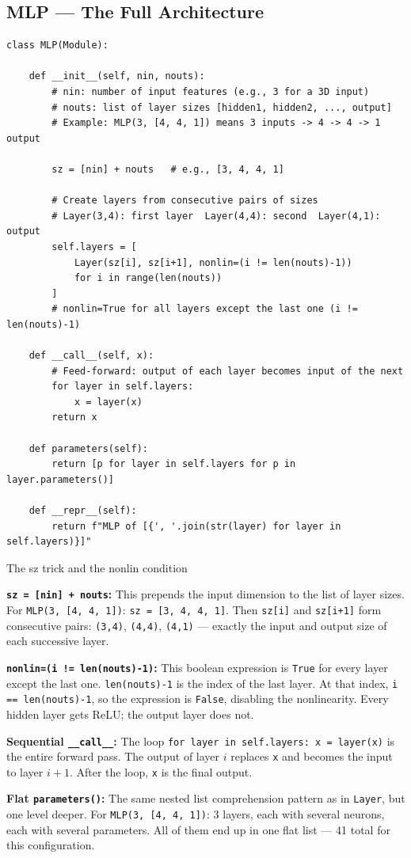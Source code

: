 \documentclass[12pt,a4paper]{article}
\newcommand{\code}[1]{\texttt{\small\color{deepblue}#1}}
\begin{document}
\subsection{MLP — The Full Architecture}

\begin{lstlisting}
class MLP(Module):

    def __init__(self, nin, nouts):
        # nin: number of input features (e.g., 3 for a 3D input)
        # nouts: list of layer sizes [hidden1, hidden2, ..., output]
        # Example: MLP(3, [4, 4, 1]) means 3 inputs -> 4 -> 4 -> 1 output

        sz = [nin] + nouts   # e.g., [3, 4, 4, 1]

        # Create layers from consecutive pairs of sizes
        # Layer(3,4): first layer  Layer(4,4): second  Layer(4,1): output
        self.layers = [
            Layer(sz[i], sz[i+1], nonlin=(i != len(nouts)-1))
            for i in range(len(nouts))
        ]
        # nonlin=True for all layers except the last one (i != len(nouts)-1)

    def __call__(self, x):
        # Feed-forward: output of each layer becomes input of the next
        for layer in self.layers:
            x = layer(x)
        return x

    def parameters(self):
        return [p for layer in self.layers for p in layer.parameters()]

    def __repr__(self):
        return f"MLP of [{', '.join(str(layer) for layer in self.layers)}]"
\end{lstlisting}

\begin{codeexplainbox}{The sz trick and the nonlin condition}

\textbf{\code{sz = [nin] + nouts}:} This prepends the input dimension to the list of layer sizes. For \code{MLP(3, [4, 4, 1])}: \code{sz = [3, 4, 4, 1]}. Then \code{sz[i]} and \code{sz[i+1]} form consecutive pairs: \code{(3,4)}, \code{(4,4)}, \code{(4,1)} — exactly the input and output size of each successive layer.

\textbf{\code{nonlin=(i != len(nouts)-1)}:} This boolean expression is \code{True} for every layer except the last one. \code{len(nouts)-1} is the index of the last layer. At that index, \code{i == len(nouts)-1}, so the expression is \code{False}, disabling the nonlinearity. Every hidden layer gets ReLU; the output layer does not.

\textbf{Sequential \code{\_\_call\_\_}:} The loop \code{for layer in self.layers: x = layer(x)} is the entire forward pass. The output of layer $i$ replaces \code{x} and becomes the input to layer $i+1$. After the loop, \code{x} is the final output.

\textbf{Flat \code{parameters()}:} The same nested list comprehension pattern as in \code{Layer}, but one level deeper. For \code{MLP(3, [4, 4, 1])}: 3 layers, each with several neurons, each with several parameters. All of them end up in one flat list — 41 total for this configuration.
\end{codeexplainbox}
\end{document}
